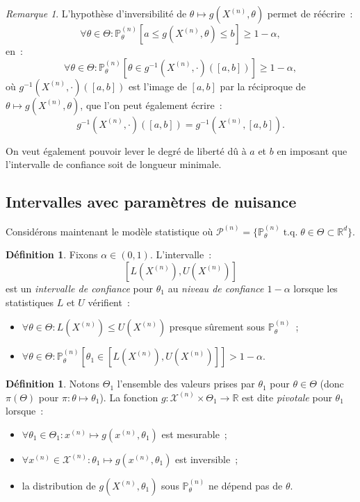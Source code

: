 \documentclass{report}
\DeclareMathOperator{\tq}{\text{ t.q. }}
\renewcommand{\P}{\mathbb P}
\newcommand{\R}{\mathbb R}
\newcommand{\n}{{(n)}}
\newcommand{\Xn}{{X^\n}}
\theoremstyle{definition}
\newtheorem{déf}[thm]{Définition}
\theoremstyle{remark}
\newtheorem*{rmq}{Remarque}
\begin{document}
			\begin{rmq} L'hypothèse d'inversibilité de $\theta \mapsto g(\Xn, \theta)$ permet de réécrire~:
			\[\forall \theta \in \Theta : \P_\theta^\n\left[a \leq g(\Xn, \theta) \leq b\right] \geq 1-\alpha,\]
			en~:
			\[\forall \theta \in \Theta : \P_\theta^\n\left[\theta \in g^{-1}(\Xn, \cdot)([a, b])\right] \geq 1-\alpha,\]
			où $g^{-1}(\Xn, \cdot)([a, b])$ est l'image de $[a, b]$ par la réciproque de $\theta \mapsto g(\Xn, \theta)$, que l'on peut également écrire~:
			\[g^{-1}(\Xn, \cdot)([a, b]) = g^{-1}(\Xn, [a, b]).\]

			On veut également pouvoir lever le degré de liberté dû à $a$ et $b$ en imposant que l'intervalle de confiance soit de longueur minimale.
			\end{rmq}

		\subsection{Intervalles avec paramètres de nuisance}
			Considérons maintenant le modèle statistique où $\mathcal P^\n = \{\P_\theta^\n \tq \theta \in \Theta \subset \R^d\}$.

			\begin{déf} Fixons $\alpha \in (0, 1)$. L'intervalle~:
			\[\left[L(\Xn), U(\Xn)\right]\]
			est un \textit{intervalle de confiance} pour $\theta_1$ au \textit{niveau de confiance $1-\alpha$} lorsque les statistiques $L$ et $U$ vérifient~:
			\begin{itemize}
				\item $\forall \theta \in \Theta : L(\Xn) \leq U(\Xn)$ presque sûrement sous $\P_\theta^\n$~;
				\item $\forall \theta \in \Theta : \P_\theta^\n\left[\theta_1 \in \left[L(\Xn), U(\Xn)\right]\right] > 1-\alpha$.
			\end{itemize}
			\end{déf}

			\begin{déf} Notons $\Theta_1$ l'ensemble des valeurs prises par $\theta_1$ pour $\theta \in \Theta$ (donc $\pi(\Theta)$ pour $\pi :
			\theta \mapsto \theta_1$). La fonction $g : \mathcal X^\n \times \Theta_1 \to \R$ est dite \textit{pivotale} pour $\theta_1$ lorsque~:
			\begin{itemize}
				\item $\forall \theta_1 \in \Theta_1 : x^\n \mapsto g(x^\n, \theta_1)$ est mesurable~;
				\item $\forall x^\n \in \mathcal X^\n : \theta_1 \mapsto g(x^\n, \theta_1)$ est inversible~;
				\item la distribution de $g(X^\n, \theta_1)$ sous $\P_\theta^\n$ ne dépend pas de $\theta$.
			\end{itemize}
			\end{déf}
\end{document}
